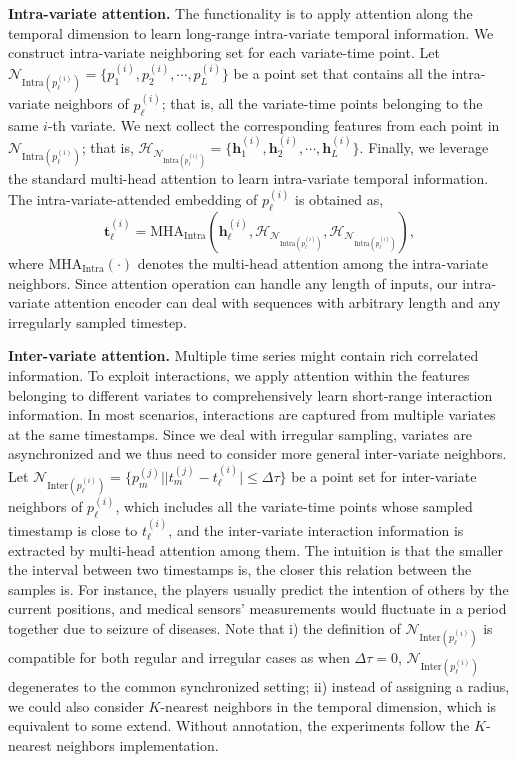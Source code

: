 \documentclass[twocolumn]{article}
\begin{document}
\textbf{Intra-variate attention.} The functionality is to apply attention along the temporal dimension to learn long-range intra-variate temporal information. We construct intra-variate neighboring set for each variate-time point. Let $\mathcal{N}_{\text{Intra}(p_\ell^{(i)})} = \{p_1^{(i)}, p_2^{(i)}, \cdots, p_L^{(i)}\}$ be a point set that contains all the intra-variate neighbors of $p_\ell^{(i)}$; that is, all the variate-time points belonging to the same $i$-th variate. We next collect the corresponding features from each point in $\mathcal{N}_{\text{Intra}(p_\ell^{(i)})}$; that is, $\mathcal{H}_{\mathcal{N}_{\text{Intra}(p_\ell^{(i)})}} = \{\mathbf{h}_1^{(i)}, \mathbf{h}_2^{(i)}, \cdots, \mathbf{h}_L^{(i)}\}$. Finally, we leverage the standard multi-head attention to learn intra-variate temporal information. The intra-variate-attended embedding of $p_\ell^{(i)}$ is obtained as,
\begin{equation}
    \mathbf{t}_\ell^{(i)} = \text{MHA}_{\text{Intra}}(\mathbf{h}_\ell^{(i)}, \mathcal{H}_{\mathcal{N}_{\text{Intra}(p_\ell^{(i)})}}, \mathcal{H}_{\mathcal{N}_{\text{Intra}(p_\ell^{(i)})}}),
\end{equation}
where $\text{MHA}_{\text{Intra}}(\cdot)$ denotes the multi-head attention among the intra-variate neighbors. Since attention operation can handle any length of inputs, our intra-variate attention encoder can deal with sequences with arbitrary length and any irregularly sampled timestep.

\textbf{Inter-variate attention.} Multiple time series might contain rich correlated information. To exploit interactions, we apply attention within the features belonging to different variates to comprehensively learn short-range interaction information. In most scenarios, interactions are captured from multiple variates at the same timestamps. Since we deal with irregular sampling, variates are asynchronized and we thus need to consider more general inter-variate neighbors. Let $\mathcal{N}_{\text{Inter}(p_\ell^{(i)})} = \{p_m^{(j)} | |t_m^{(j)} - t_\ell^{(i)}| \leq \Delta \tau\}$ be a point set for inter-variate neighbors of $p_\ell^{(i)}$, which includes all the variate-time points whose sampled timestamp is close to $t_\ell^{(i)}$, and the inter-variate interaction information is extracted by multi-head attention among them. The intuition is that the smaller the interval between two timestamps is, the closer this relation between the samples is. For instance, the players usually predict the intention of others by the current positions, and medical sensors' measurements would fluctuate in a period together due to seizure of diseases. Note that i) the definition of $\mathcal{N}_{\text{Inter}(p_\ell^{(i)})}$ is compatible for both regular and irregular cases as when $\Delta \tau = 0$, $\mathcal{N}_{\text{Inter}(p_\ell^{(i)})}$ degenerates to the common synchronized setting; ii) instead of assigning a radius, we could also consider $K$-nearest neighbors in the temporal dimension, which is equivalent to some extend. Without annotation, the experiments follow the $K$-nearest neighbors implementation.
\end{document}
